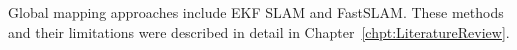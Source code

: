 %
%
%
%


Global mapping approaches include EKF SLAM and FastSLAM. These methods
and their limitations were described in detail in
Chapter~\ref{chpt:LiteratureReview}.

